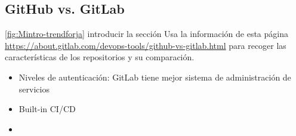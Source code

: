 
\subsection{GitHub vs. GitLab}
\ref{fig:Mintro-trendforja}
\todo introducir la sección
\todo Usa la información de esta página \url{https://about.gitlab.com/devops-tools/github-vs-gitlab.html} para recoger las características de los repositorios 
y su comparación.

\begin{itemize}
	\item Niveles de autenticación: GitLab tiene mejor sistema de administración de servicios
	\item Built-in CI/CD
	\item 
\end{itemize}
